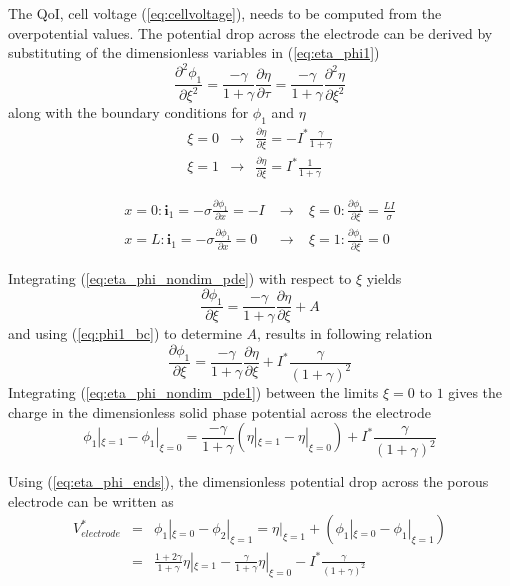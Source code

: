\documentclass[]{article}
\begin{document}
The QoI, cell voltage (\ref{eq:cellvoltage}), needs to be computed from the overpotential values. The potential drop across the electrode can be derived by substituting of the dimensionless variables in (\ref{eq:eta_phi1}) 
%
\begin{equation}\label{eq:eta_phi_nondim_pde}
\frac{\partial^2\phi_1}{\partial\xi^2} = \frac{-\gamma}{1+\gamma}\frac{\partial\eta}{\partial\tau} = \frac{-\gamma}{1+\gamma}\frac{\partial^2\eta}{\partial\xi^2}
\end{equation}
%
along with the boundary conditions for $\phi_1$ and $\eta$
%
\begin{eqnarray}
\xi = 0 &\rightarrow& \frac{\partial\eta}{\partial\xi}= -I^*\frac{\gamma}{1+\gamma} \\
\xi = 1 &\rightarrow& \frac{\partial\eta}{\partial\xi}= I^*\frac{1}{1+\gamma}
\end{eqnarray}

\begin{eqnarray}
x = 0   : \mathbf{i}_1=-\sigma	\frac{\partial\phi_1}{\partial x}= -I  \; &\rightarrow& \;   
\xi = 0 : \frac{\partial\phi_1}{\partial\xi}= \frac{LI}{\sigma} \\
x = L   : \mathbf{i}_1=-\sigma	\frac{\partial\phi_1}{\partial x}= 0  \;  &\rightarrow& \; 
\xi = 1 : \frac{\partial\phi_1}{\partial\xi}= 0 \label{eq:phi1_bc}
\end{eqnarray}

Integrating (\ref{eq:eta_phi_nondim_pde}) with respect to $\xi$ yields
%
\begin{equation}
\frac{\partial\phi_1}{\partial\xi} = \frac{-\gamma}{1+\gamma}\frac{\partial\eta}{\partial\xi} + A
\end{equation}
%
and using (\ref{eq:phi1_bc}) to determine $A$, results in following relation
%
\begin{equation} \label{eq:eta_phi_nondim_pde1}
\frac{\partial\phi_1}{\partial\xi} = \frac{-\gamma}{1+\gamma}\frac{\partial\eta}{\partial\xi} + I^*\frac{\gamma}{(1+\gamma)^2}
\end{equation}
%
Integrating (\ref{eq:eta_phi_nondim_pde1}) between the limits $\xi=0$ to $1$ gives the charge in the dimensionless solid phase potential across the electrode
%
\begin{equation} \label{eq:eta_phi_ends}
\phi_1|_{\xi=1} - \phi_1|_{\xi=0} = 
\frac{-\gamma}{1+\gamma}\left(\eta|_{\xi=1} - \eta|_{\xi=0}\right) + I^*\frac{\gamma}{(1+\gamma)^2}
\end{equation}
%

Using (\ref{eq:eta_phi_ends}), the dimensionless potential drop across the porous electrode can be written as
%
\begin{eqnarray}\label{eq:Vellectrod}
V^*_{electrode} &=& \phi_1|_{\xi=0} - \phi_2|_{\xi=1} = \eta|_{\xi=1} + (\phi_1|_{\xi=0} - \phi_1|_{\xi=1})\\
				&=&  \frac{1+2\gamma}{1+\gamma}\eta|_{\xi=1} - \frac{\gamma}{1+\gamma}\eta|_{\xi=0} - I^*\frac{\gamma}{(1+\gamma)^2}
\end{eqnarray}
%
\end{document}
